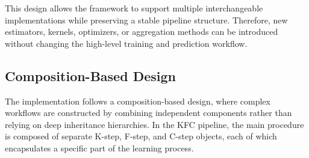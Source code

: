 This design allows the framework to support multiple interchangeable implementations while preserving a stable pipeline structure. Therefore, new estimators, kernels, optimizers, or aggregation methods can be introduced without changing the high-level training and prediction workflow.


\subsection{Composition-Based Design}

\hs The implementation follows a composition-based design, where complex workflows are constructed by combining independent components rather than relying on deep inheritance hierarchies. In the KFC pipeline, the main procedure is composed of separate K-step, F-step, and C-step objects, each of which encapsulates a specific part of the learning process.

